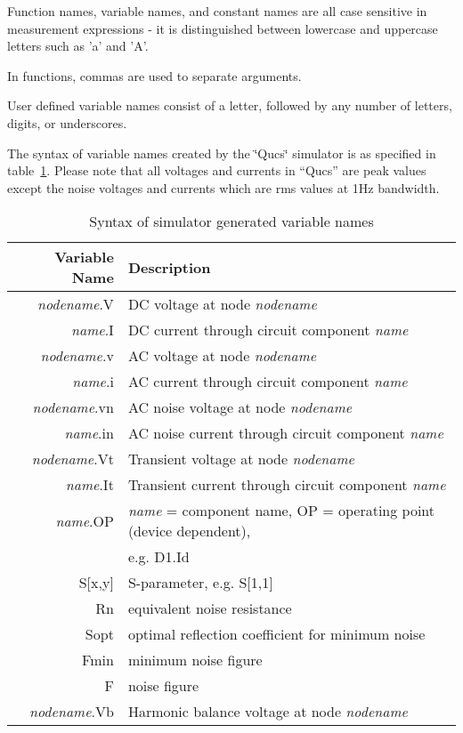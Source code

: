 Function names, variable names, and constant names are all case sensitive
in measurement expressions - it is distinguished between lowercase
and uppercase letters such as 'a' and 'A'.

In functions, commas are used to separate arguments.



User defined variable names consist of a letter, followed by any number
of letters, digits, or underscores.

The syntax of variable names created by the \char`\"{}Qucs\char`\"{}
simulator is as specified in table~\ref{table:var_names}.  Please note
that all voltages and currents in {}``Qucs'' are peak values except
the noise voltages and currents which are rms values at 1Hz bandwidth.

%
\begin{table}[ht]
\begin{flushleft}\begin{tabular}{|r|l|}
\hline 
Variable Name&
Description\tabularnewline
\hline
\hline 
\textit{nodename}.V&
DC voltage at node \textit{nodename}\tabularnewline
\hline 
\textit{name}.I&
DC current through circuit component \textit{name}\tabularnewline
\hline 
\textit{nodename}.v&
AC voltage at node \textit{nodename}\tabularnewline
\hline 
\textit{name}.i&
AC current through circuit component \textit{name}\tabularnewline
\hline 
\textit{nodename}.vn&
AC noise voltage at node \textit{nodename}\tabularnewline
\hline 
\textit{name}.in&
AC noise current through circuit component \textit{name}\tabularnewline
\hline 
\textit{nodename}.Vt&
Transient voltage at node \textit{nodename}\tabularnewline
\hline 
\textit{name}.It&
Transient current through circuit component \textit{name}\tabularnewline
\hline
\textit{name}.OP&
\textit{name} = component name, OP = operating point (device dependent),\tabularnewline
&
 e.g. D1.Id\tabularnewline
\hline
S{[}x,y{]}&
S-parameter, e.g. S{[}1,1{]}\tabularnewline
\hline
Rn&
equivalent noise resistance\tabularnewline
\hline
Sopt&
optimal reflection coefficient for minimum noise\tabularnewline
\hline
Fmin&
minimum noise figure\tabularnewline
\hline
F &
noise figure\tabularnewline
\hline
\textit{nodename}.Vb&
Harmonic balance voltage at node \textit{nodename}\tabularnewline
\hline 
\end{tabular}\end{flushleft}


\caption{\label{table:var_names}Syntax of simulator generated variable names}
\end{table}



